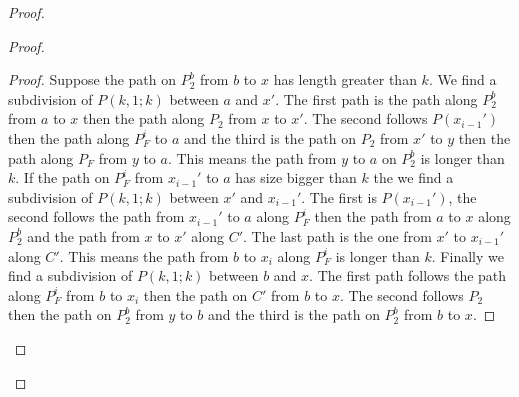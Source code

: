 \documentclass[utf8,10pt]{article}
\theoremstyle{plain}
\theoremstyle{definition}
\theoremstyle{remark}
\begin{document}
\begin{proof}
\begin{proof}
\begin{proof}
Suppose the path on $P_2^b$ from $b$ to $x$ has length greater than $k$. We find a subdivision of $P(k,1;k)$ between $a$ and $x'$.
The first path is the path along $P_2^b$ from $a$ to $x$ then the path along $P_2$ from $x$ to $x'$. The second follows $P(x_{i-1}')$
then the path along $P_F^i$ to $a$ and the third is the path on $P_2$ from $x'$ to $y$ then the path along $P_F$ from $y$ to $a$.
This means the path from $y$ to
$a$ on $P_2^b$ is longer than $k$. If the path on $P_F^i$ from  $x_{i-1}'$ to $a$ has size bigger than $k$ the we find a subdivision
of $P(k,1;k)$ between $x'$ and $x_{i-1}'$. The first is $P(x_{i-1}')$, the second follows the path from $x_{i-1}'$ to $a$ along $P_F^i$ then
the path from $a$ to $x$ along $P_2^b$ and the path from $x$ to $x'$ along $C'$. The last path is the one from $x'$ to $x_{i-1}'$ along
$C'$. This means the path from $b$ to $x_i$ along $P_F^i$ is longer than $k$. Finally we find a subdivision of $P(k,1;k)$ between $b$
and $x$. The first path follows the path along $P_F^i$ from $b$ to $x_i$ then the path on $C'$ from $b$ to $x$. The second follows $P_2$ then
the path on $P_2^b$ from $y$ to $b$ and the third is the path on $P_2^b$ from $b$ to $x$.

\end{proof}




\end{proof}
\end{proof}
\end{document}
